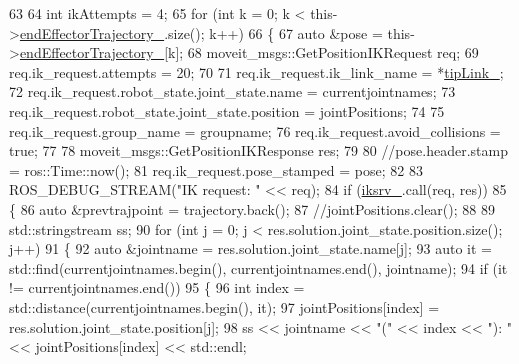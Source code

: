 \begin{DoxyCode}
63 
64         \textcolor{keywordtype}{int} ikAttempts = 4;
65         \textcolor{keywordflow}{for} (\textcolor{keywordtype}{int} k = 0; k < this->\hyperlink{classcl__move__group__interface_1_1CbMoveEndEffectorTrajectory_ae13dfd31ea3660646e03882f0c2c29f0}{endEffectorTrajectory\_}.size(); k++)
66         \{
67             \textcolor{keyword}{auto} &pose = this->\hyperlink{classcl__move__group__interface_1_1CbMoveEndEffectorTrajectory_ae13dfd31ea3660646e03882f0c2c29f0}{endEffectorTrajectory\_}[k];
68             moveit\_msgs::GetPositionIKRequest req;
69             req.ik\_request.attempts = 20;
70 
71             req.ik\_request.ik\_link\_name = *\hyperlink{classcl__move__group__interface_1_1CbMoveEndEffectorTrajectory_a24c6c30b9b0761a61fa002d947bd3e11}{tipLink\_};
72             req.ik\_request.robot\_state.joint\_state.name = currentjointnames;
73             req.ik\_request.robot\_state.joint\_state.position = jointPositions;
74 
75             req.ik\_request.group\_name = groupname;
76             req.ik\_request.avoid\_collisions = \textcolor{keyword}{true};
77 
78             moveit\_msgs::GetPositionIKResponse res;
79 
80             \textcolor{comment}{//pose.header.stamp = ros::Time::now();}
81             req.ik\_request.pose\_stamped = pose;
82 
83             ROS\_DEBUG\_STREAM(\textcolor{stringliteral}{"IK request: "} << req);
84             \textcolor{keywordflow}{if} (\hyperlink{classcl__move__group__interface_1_1CbMoveEndEffectorTrajectory_a8a2e2225a5b53325241e45e4e28fa3a7}{iksrv\_}.call(req, res))
85             \{
86                 \textcolor{keyword}{auto} &prevtrajpoint = trajectory.back();
87                 \textcolor{comment}{//jointPositions.clear();}
88 
89                 std::stringstream ss;
90                 \textcolor{keywordflow}{for} (\textcolor{keywordtype}{int} j = 0; j < res.solution.joint\_state.position.size(); j++)
91                 \{
92                     \textcolor{keyword}{auto} &jointname = res.solution.joint\_state.name[j];
93                     \textcolor{keyword}{auto} it = std::find(currentjointnames.begin(), currentjointnames.end(), jointname);
94                     \textcolor{keywordflow}{if} (it != currentjointnames.end())
95                     \{
96                         \textcolor{keywordtype}{int} index = std::distance(currentjointnames.begin(), it);
97                         jointPositions[index] = res.solution.joint\_state.position[j];
98                         ss << jointname << \textcolor{stringliteral}{"("} << index << \textcolor{stringliteral}{"): "} << jointPositions[index] << std::endl;

\end{DoxyCode}
